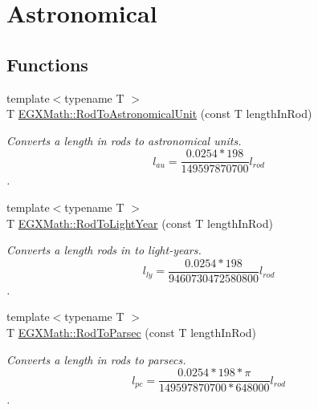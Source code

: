 \hypertarget{group___e_g_x_math-_conversions-_length_conversions-_surveyors-_rod-_astronomical}{}\section{Astronomical}
\label{group___e_g_x_math-_conversions-_length_conversions-_surveyors-_rod-_astronomical}
\subsection*{Functions}
\begin{DoxyCompactItemize}
\item 
{\footnotesize template$<$typename T $>$ }\\T \mbox{\hyperlink{group___e_g_x_math-_conversions-_length_conversions-_surveyors-_rod-_astronomical_ga320c74af81e2f062967e5c767d089a87}{E\+G\+X\+Math\+::\+Rod\+To\+Astronomical\+Unit}} (const T length\+In\+Rod)
\begin{DoxyCompactList}\small\item\em Converts a length in rods to astronomical units. \[ l_{au}=\frac{0.0254 * 198}{149597870700} l_{rod} \]. \end{DoxyCompactList}\item 
{\footnotesize template$<$typename T $>$ }\\T \mbox{\hyperlink{group___e_g_x_math-_conversions-_length_conversions-_surveyors-_rod-_astronomical_gae5824aa8a60a3fe280de82b165cc0ed7}{E\+G\+X\+Math\+::\+Rod\+To\+Light\+Year}} (const T length\+In\+Rod)
\begin{DoxyCompactList}\small\item\em Converts a length rods in to light-\/years. \[ l_{ly}=\frac{0.0254 * 198}{9460730472580800} l_{rod} \]. \end{DoxyCompactList}\item 
{\footnotesize template$<$typename T $>$ }\\T \mbox{\hyperlink{group___e_g_x_math-_conversions-_length_conversions-_surveyors-_rod-_astronomical_ga720b170a8c3243d0f7d5be0c70381cb2}{E\+G\+X\+Math\+::\+Rod\+To\+Parsec}} (const T length\+In\+Rod)
\begin{DoxyCompactList}\small\item\em Converts a length in rods to parsecs. \[ l_{pc}=\frac{0.0254 * 198 * \pi}{149597870700 * 648000} l_{rod} \]. \end{DoxyCompactList}\end{DoxyCompactItemize}


